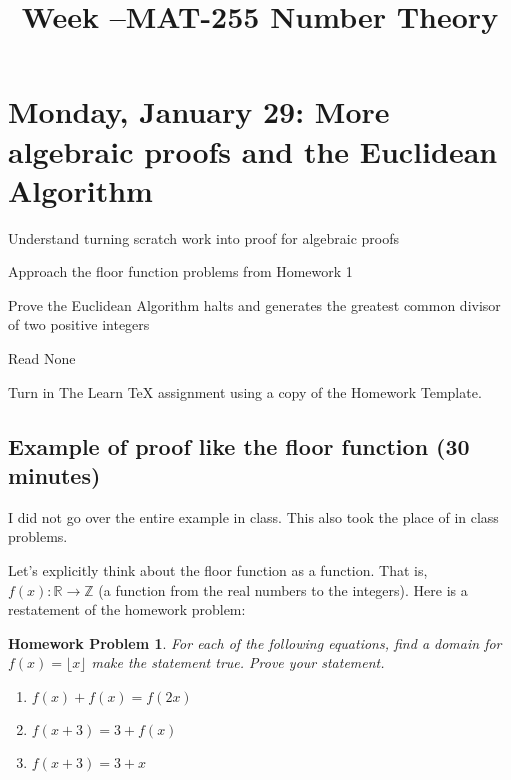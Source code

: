 \documentclass{ximera}
\title{Week \week--MAT-255 Number Theory}
\newtheorem*{prob}{Homework Problem}
\begin{document}
\section{Monday, January 29: More algebraic proofs and the Euclidean Algorithm}

\begin{obj}
\item  Understand turning scratch work into proof for algebraic proofs
\item  Approach the floor function problems from Homework 1
\item Prove the Euclidean Algorithm halts and generates the greatest common divisor of two positive integers
\end{obj}

\begin{pre}
 \item[Read] None 
 \item[Turn in] The Learn TeX assignment using a copy of the Homework Template.
\end{pre}
\subsection{Example of proof like the floor function (30 minutes)}
I did not go over the entire example in class. This also took the place of in class problems.

Let's explicitly think about the floor function as a function. That is, $f(x):\mathbb{R}\to\mathbb{Z}$ (a function from the real numbers to the integers). Here is a restatement of the homework problem:

\begin{prob}
For each of the following equations, find a domain for $f(x)=\lfloor x \rfloor$ make the statement true. Prove your statement. 
	\begin{enumerate}
 		\item $f( x ) + f( x ) =f( 2x)$
		\item $f( x + 3 )  = 3 +f( x)$
		\item $f( x +3 ) = 	3 + x$
	\end{enumerate} 
\end{prob}
\end{document}
